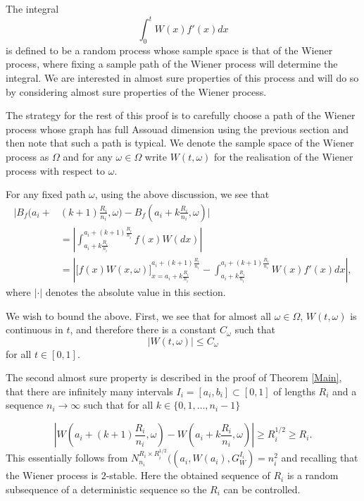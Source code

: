 	The integral 
	\[
	\int_0^{t} W(x)f'(x)dx
	\]
	is defined to be a random process whose sample space is that of the Wiener process, where fixing a sample path of the Wiener process will determine the integral. We are interested in almost sure properties of this process and will do so by considering almost sure properties of the Wiener process.
	
	The strategy for the rest of this proof is to carefully choose a path of the Wiener process whose graph has full Assouad dimension using the previous section and then note that such a path is typical. We denote the sample space of the Wiener process as $\Omega$ and for any $\omega \in \Omega$ write $W(t,\omega)$ for the realisation of the Wiener process with respect to $\omega$.
	
	For any fixed path $\omega$, using the above discussion, we see that
	\begin{align*}
		\bigg\vert B_f\bigg(a_i+&(k+1)\frac{R_i}{n_i},\omega\bigg)-B_f\left(a_i+k\frac{R_i}{n_i},\omega\right)\bigg\vert\\
		&= \left| \int_{a_i+k\frac{R_i}{n_i}}^{a_i+(k+1)\frac{R_i}{n_i}} f(x)W(dx)\right|\\
		&= \left| \bigg[f\left(x\right)W(x,\omega)\bigg]_{x=a_i+k\frac{R_i}{n_i}}^{a_i+(k+1)\frac{R_i}{n_i}} - \int_{a_i+k\frac{R_i}{n_i}}^{a_i+(k+1)\frac{R_i}{n_i}} W(x)f'(x)dx \right|,
	\end{align*}
	where $\lvert \cdot \rvert$ denotes the absolute value in this section.
	
	We wish to bound the above. First, we see that for almost all $\omega\in\Omega$, $W(t,\omega)$ is continuous in $t$, and therefore there is a constant $C_\omega$ such that
	\begin{equation}
	    |W(t,\omega)|\leq C_\omega \label{first-equa}
	\end{equation}
	for all $t\in [0,1]$. 
	
	The second almost sure property is described in the proof of Theorem \ref{Main}, that there are infinitely many intervals $I_i=[a_i,b_i]\subset [0,1]$ of lengths $R_i$ and a sequence $n_i\to\infty$ such that for all $k\in\{0,1,\dots,n_i-1\}$
	
	\begin{equation}
	    \left|W\left(a_i+(k+1)\frac{R_i}{n_i},\omega\right)-W\left(a_i+k\frac{R_i}{n_i},\omega\right)\right|\geq R_i^{1/2}\geq R_i. \label{ch:brownian:second-equa}
	\end{equation}
	This essentially follows from $N_{n_i}^{R_i \times R_i^{1/2}}((a_i,W(a_i), G_W^{I_i})  = n_i^2$ and recalling that the Wiener process is $2$-stable. Here the obtained sequence of $R_i$ is a random subsequence of a deterministic sequence so the $R_i$ can be controlled.
	
